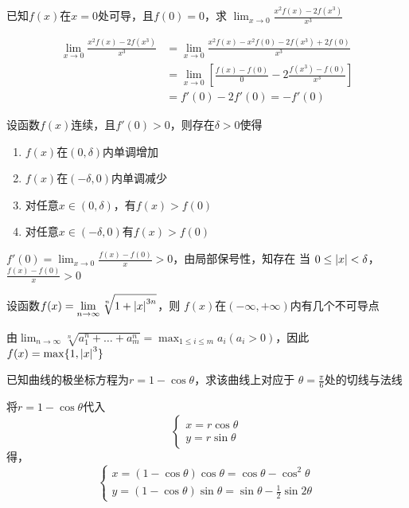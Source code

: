 \documentclass{article}
\begin{document}
\begin{examplle}[]
已知\(f(x)\)在\(x=0\)处可导，且\(f(0)=0\)，求
\(\displaystyle\lim_{x\to0}\frac{x^2f(x)-2f(x^3)}{x^3}\)

\begin{align*}
\lim_{x\to0}\frac{x^2f(x)-2f(x^3)}{x^3}&=
\lim_{x\to0}\frac{x^2f(x)-x^2f(0)-2f(x^3)+2f(0)}{x^3}\\
&=\lim_{x\to0}\left[
\frac{f(x)-f(0)}{0}-2\frac{f(x^3)-f(0)}{x^3}
\right]
\\&=f'(0)-2f'(0)=-f'(0)
\end{align*}
\end{examplle}

\begin{examplle}[]
设函数\(f(x)\)连续，且\(f'(0)>0\)，则存在\(\delta>0\)使得
\begin{enumerate}
\item \(f(x)\)在\((0,\delta)\)内单调增加
\item \(f(x)\)在\((-\delta,0)\)内单调减少
\item 对任意\(x\in(0,\delta)\)，有\(f(x)>f(0)\)
\item 对任意\(x\in(-\delta,0)\)有\(f(x)>f(0)\)
\end{enumerate}


\(f'(0)=\displaystyle\lim_{x\to0}\frac{f(x)-f(0)}{x}>0\)，由局部保号性，知存在
当
\(0\le\abs{x}<\delta\)，\(\frac{f(x)-f(0)}{x}>0\)
\end{examplle}

\begin{examplle}[]
设函数\(f(x)=\displaystyle\lim_{n\to\infty}\sqrt[n]{1+\abs{x}^{3n}}\)，则
\(f(x)\)在\((-\infty,+\infty)\)内有几个不可导点

由\(\displaystyle\lim_{n\to\infty}\sqrt[n]{a_1^n+\dots+a_m^n}=\max_{1\le i\le
  m}a_i(a_i>0)\)，因此
\(f(x)=\max\{1,\abs{x}^3\}\)
\end{examplle}

\begin{examplle}[]
已知曲线的极坐标方程为\(r=1-\cos\theta\)，求该曲线上对应于
\(\theta=\frac{\pi}{6}\)处的切线与法线

将\(r=1-\cos\theta\)代入
\begin{equation*}
\begin{cases}
x=r\cos\theta\\
y=r\sin\theta
\end{cases}
\end{equation*}
得，
\begin{equation*}
\begin{cases}
x=(1-\cos\theta)\cos\theta=\cos\theta-\cos^2\theta\\
y=(1-\cos\theta)\sin\theta=\sin\theta-\frac{1}{2}\sin2\theta
\end{cases}
\end{equation*}
\end{examplle}
\end{document}
